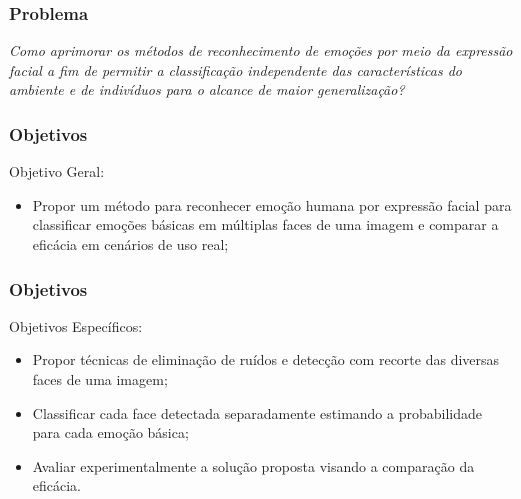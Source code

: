 \documentclass{beamer}
\begin{document}

\begin{frame}
\frametitle{Problema}
\pause
\textit{Como aprimorar os métodos de reconhecimento de emoções por meio da expressão facial a fim de permitir a classificação independente das características do ambiente e de indivíduos para o alcance de maior generalização?} 


\end{frame}


\begin{frame}
\frametitle{Objetivos}
\begin{block}{Objetivo Geral:}
\begin{itemize}
\pause
\item Propor um método para reconhecer emoção humana por expressão facial para classificar emoções básicas em múltiplas faces de uma imagem e comparar a eficácia em cenários de uso real;
\end{itemize}
\end{block}


\frametitle{Objetivos}
\begin{block}{Objetivos Específicos:}
\begin{itemize}
\pause
 \item Propor técnicas de eliminação de ruídos e detecção com recorte das diversas faces de uma imagem;
 \pause
 \item Classificar cada face detectada separadamente estimando a probabilidade para cada emoção básica;
 \pause
 \item Avaliar experimentalmente a solução proposta visando a comparação da eficácia.
\end{itemize}
\end{block}
\end{frame}
\end{document}
